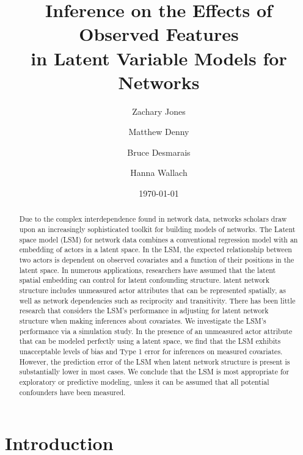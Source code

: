 \documentclass[11pt]{article}
\title{\vspace{-2cm} Inference on the Effects of Observed Features
\\ in Latent Variable Models for Networks }
\author{ Zachary Jones \and Matthew Denny \and Bruce Desmarais \and Hanna Wallach} \date{\today}
\begin{document}
\maketitle




\begin{abstract}

\noindent Due to the complex interdependence found in network data,
networks scholars draw upon an increasingly sophisticated
toolkit for building models of networks. The Latent space model (LSM) for
network data combines a conventional regression model with an embedding of actors in a latent space. In the LSM, the expected relationship between two actors is dependent on observed covariates and a function of their positions in the latent space. In numerous applications, researchers have assumed
that the latent spatial embedding can control for latent
confounding structure. latent network structure includes unmeasured actor attributes that can be represented spatially, as well as network dependencies such as reciprocity and transitivity. There has been little research that considers the LSM's
performance in adjusting for latent network structure when making inferences about covariates. We investigate the
LSM's performance via a simulation study. In the presence of an
unmeasured actor attribute that can be modeled perfectly using a latent space,
we find that the LSM exhibits unacceptable levels of bias and Type 1 error for inferences on measured covariates. However, the prediction error of the LSM when latent network structure is present is substantially lower in most cases. We
conclude that the LSM is most appropriate for exploratory or predictive modeling, unless it can be assumed that all potential confounders have been measured.
\end{abstract}
\thispagestyle{empty}
\section{Introduction}
\end{document}
